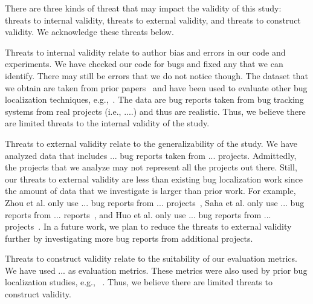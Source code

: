 
There are three kinds of threat that may impact the validity of this study: threats to internal validity, threats to external validity, and threats to construct validity. We acknowledge these threats below.

Threats to internal validity relate to author bias and errors in our code and experiments. We have checked our code for bugs and fixed any that we can identify. There may still be errors that we do not notice though. The dataset that we obtain are taken from prior papers~\cite{zhou2012should,KochharTL14} and have been used to evaluate other bug localization techniques, e.g.,~\cite{zhou2012should,SahaLKP14,huo2016learning}. The data are bug reports taken from bug tracking systems from real projects (i.e., ....) and thus are realistic. Thus, we believe there are limited threats to the internal validity of the study. 

Threats to external validity relate to the generalizability of the study. We have analyzed data that includes ... bug reports taken from ... projects. Admittedly, the projects that we analyze may not represent all the projects out there. Still, our threats to external validity are less than existing bug localization work since the amount of data that we investigate is larger than prior work. For example, Zhou et al. only use ... bug reports from ... projects~\cite{zhou2012should}, Saha et al. only use ... bug reports from ... reports~\cite{SahaLKP14}, and Huo et al. only use ... bug reports from ... projects~\cite{huo2016learning}. In a future work, we plan to reduce the threats to external validity further by investigating more bug reports from additional projects.

Threats to construct validity relate to the suitability of our evaluation metrics. We have used ... as evaluation metrics. These metrics were also used by prior bug localization studies, e.g.,  ~\cite{zhou2012should,SahaLKP14,huo2016learning}. Thus, we believe there are limited threats to construct validity. 